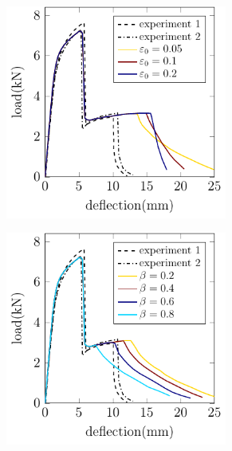 \begin{frame}
  \vspace{-1.5em}
  \begin{columns}[T]
    \begin{column}{0.6\textwidth}
      \vspace{-1em}
      \begin{figure}
        \centering
        \begin{subfigure}{0.32\linewidth}
          \centering
          \includegraphics[width=0.8\textwidth]{Chapter345/figures/Chapter5-3pb-load_deflection-constant_beta}
        \end{subfigure}
        \begin{subfigure}{0.32\linewidth}
          \centering
          \includegraphics[width=0.8\textwidth]{Chapter345/figures/Chapter5-3pb-load_deflection-constant_e0}

\end{subfigure}
\end{figure}
\end{column}
\end{columns}
\end{frame}

